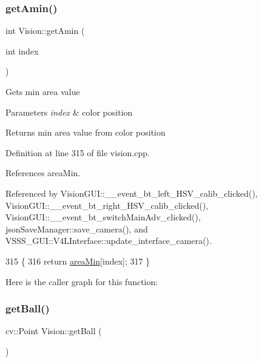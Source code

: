 \subsubsection{\texorpdfstring{get\+Amin()}{getAmin()}}
{\footnotesize\ttfamily int Vision\+::get\+Amin (\begin{DoxyParamCaption}\item[{int}]{index }\end{DoxyParamCaption})}

Gets min area value 
\begin{DoxyParams}{Parameters}
{\em index} & color position \\
\hline
\end{DoxyParams}
\begin{DoxyReturn}{Returns}
min area value from color position 
\end{DoxyReturn}


Definition at line 315 of file vision.\+cpp.



References area\+Min.



Referenced by Vision\+G\+U\+I\+::\+\_\+\+\_\+event\+\_\+bt\+\_\+left\+\_\+\+H\+S\+V\+\_\+calib\+\_\+clicked(), Vision\+G\+U\+I\+::\+\_\+\+\_\+event\+\_\+bt\+\_\+right\+\_\+\+H\+S\+V\+\_\+calib\+\_\+clicked(), Vision\+G\+U\+I\+::\+\_\+\+\_\+event\+\_\+bt\+\_\+switch\+Main\+Adv\+\_\+clicked(), json\+Save\+Manager\+::save\+\_\+camera(), and V\+S\+S\+S\+\_\+\+G\+U\+I\+::\+V4\+L\+Interface\+::update\+\_\+interface\+\_\+camera().


\begin{DoxyCode}
315                              \{
316     \textcolor{keywordflow}{return} \hyperlink{class_vision_a674b5bf7f6570f5b8e053ee28a9721ff}{areaMin}[index];
317 \}
\end{DoxyCode}
Here is the caller graph for this function\+:
\mbox{\label{class_vision_a17e19e24cfc7948f646a3cca0488437a}} 
\subsubsection{\texorpdfstring{get\+Ball()}{getBall()}}
{\footnotesize\ttfamily cv\+::\+Point Vision\+::get\+Ball (\begin{DoxyParamCaption}{ }\end{DoxyParamCaption})}


